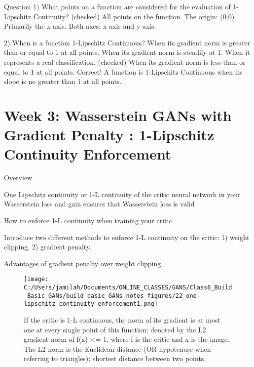 \documentclass[11pt, onecolumn]{article}
\begin{document}
Question
1) What points on a function are considered for the evaluation of 1-Lipschitz Continuity?
(checked) All points on the function.
The origin: (0,0).
Primarily the x-axis.
Both axes: x-axis and y-axis.

2) When is a function 1-Lipschitz Continuous?
When its gradient norm is greater than or equal to 1 at all points.
When its gradient norm is steadily at 1.
When it represents a real classification.
(checked) When its gradient norm is less than or equal to 1 at all points.
Correct! A function is 1-Lipschitz Continuous when its slope is no greater than 1 at all points.

\section{Week 3: Wasserstein GANs with Gradient Penalty : 1-Lipschitz Continuity Enforcement}

Overview
\item One Lipschitz continuity or 1-L continuity of the critic neural network in your Wasserstein loss and gain ensures that Wasserstein loss is valid
\item How to enforce 1-L continuity when training your critic
\item Introduce two different methods to enforce 1-L continuity on the critic: 1) weight clipping, 2) gradient penalty.
\item Advantages of gradient penalty over weight clipping

\begin{figure}[htp]
\begin{center}
\texttt{[image: C:/Users/jamilah/Documents/ONLINE\_CLASSES/GANS/Class6\_Build\_Basic\_GANs/build\_basic\_GANs\_notes\_figures/22\_one-lipschitz\_continuity\_enforcement1.png]}
\end{center}
\caption{If the critic is 1-L continuous, the norm of its gradient is at most one at every single point of this function; denoted by the L2 gradient norm of f(x) <= 1, where f is the critic and x is the image. The L2 norm is the Euclidean distance (OR hypotenuse when referring to triangles); shortest distance between two points.}
\label{22_one-lipschitz_continuity_enforcement1}
\end{figure}
\end{document}
